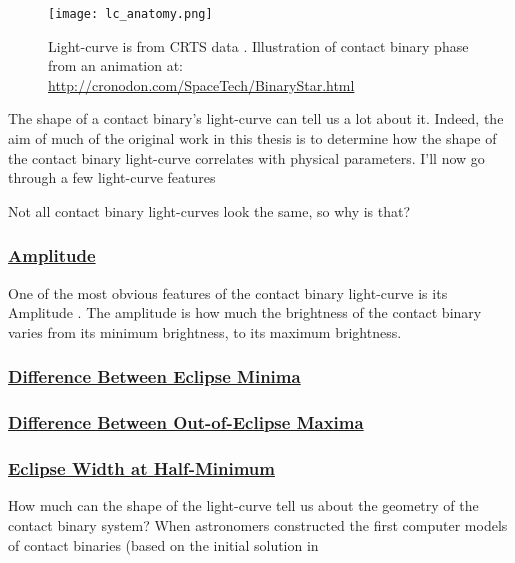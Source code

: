\documentclass[12pt]{article} %
\numberwithin{equation}{section} %
\begin{document}
\begin{figure}[H]
\centering
\texttt{[image: lc\_anatomy.png]}
\caption{Light-curve is from CRTS data \citep{drake2014catalina}. Illustration of contact binary phase from an animation at: \url{http://cronodon.com/SpaceTech/BinaryStar.html}}
\label{fig: lc_anatomy}
\end{figure}

The shape of a contact binary's light-curve can tell us a lot about it. Indeed, the aim of much of the original work in this thesis is to determine how the shape of the contact binary light-curve correlates with physical parameters. I'll now go through a few light-curve features 

Not all contact binary light-curves look the same, so why is that?

\subsubsection[Amplitude]{\hyperlink{toc}{Amplitude}} \label{sec: Amplitude}

One of the most obvious features of the contact binary light-curve is its Amplitude . The amplitude is how much the brightness of the contact binary varies from its minimum brightness, to its maximum brightness.

\subsubsection[Difference Between Eclipse Minima]{\hyperlink{toc}{Difference Between Eclipse Minima}} \label{sec: Difference Between Eclipse Minima}

\subsubsection[Difference Between Out-of-Eclipse Maxima]{\hyperlink{toc}{Difference Between Out-of-Eclipse Maxima}} \label{sec: Difference Between Out-of-Eclipse Maxima}

\subsubsection[Eclipse Width at Half-Minimum]{\hyperlink{toc}{Eclipse Width at Half-Minimum}} \label{sec: Eclipse Width at Half-Minimum}

How much can the shape of the light-curve tell us about the geometry of the contact binary system? When astronomers constructed the first computer models of contact binaries (based on the initial solution in \cite{lucy1968light}
\end{document}
